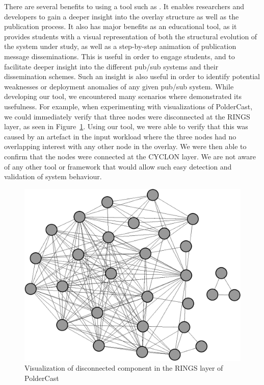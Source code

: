 There are several benefits to using a tool such as \demo. It enables
researchers and developers to gain a deeper insight into the overlay
structure as well as the publication process. It also has major benefits
as an educational tool, as it provides students with a visual
representation of both the structural evolution of the system under
study, as well as a step-by-step animation of publication message
disseminations. This is useful in order to engage students, and to
facilitate deeper insight into the different pub/sub systems and their
dissemination schemes. Such an insight is also useful in order to
identify potential weaknesses or deployment anomalies of any given
pub/sub system. While developing our tool, we encountered many scenarios
where \demo{} demonstrated its usefulness. For example, when
experimenting with visualizations of PolderCast, we could immediately
verify that three nodes were disconnected at the RINGS layer, as seen in
Figure~\ref{fig:pold_disc}.  Using our tool, we were able to verify that
this was caused by an artefact in the input workload where the three
nodes had no overlapping interest with any other node in the overlay. We
were then able to confirm that the nodes were connected at the CYCLON
layer. We are not aware of any other tool or framework that would allow
such easy detection and validation of system behaviour.

\begin{figure}[h]
\includegraphics[width=\linewidth]{figures/disconnected-component-poldercast.pdf}
\caption{Visualization of disconnected component in the RINGS layer of PolderCast}
\label{fig:pold_disc}
\end{figure}


